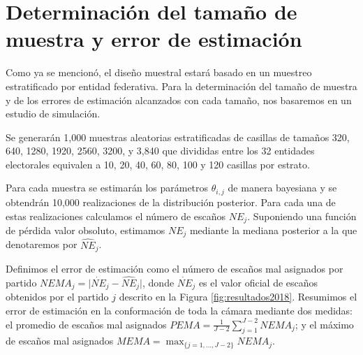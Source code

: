 \documentclass[]{article}
\begin{document}
\hypertarget{diseno-muestral}{%
\section{Determinación del tamaño de muestra y error de estimación}\label{diseno-muestral}}

Como ya se mencionó, el diseño muestral estará basado en un muestreo estratificado por entidad federativa. Para la determinación del tamaño de muestra y de los errores de estimación alcanzados con cada tamaño, nos basaremos en un estudio de simulación. 

Se generarán 1,000 muestras aleatorias estratificadas de casillas de tamaños 320, 640, 1280, 1920, 2560, 3200, y 3,840 que divididas entre los 32 entidades electorales equivalen a 10, 20, 40, 60, 80, 100 y 120 casillas por estrato.

Para cada muestra se estimarán los parámetros $\theta_{i,j}$ de manera bayesiana y se obtendrán 10,000 realizaciones de la distribución posterior. Para cada una de estas realizaciones calculamos el número de escaños $NE_j$. Suponiendo una función de pérdida valor obsoluto, estimamos $NE_j$ mediante la mediana posterior a la que denotaremos por $\widehat{NE}_j$.

Definimos el error de estimación como el número de escaños mal asignados por partido $NEMA_j=\lvert{\dot{NE}_j-\widehat{NE}_j}\rvert$, donde $\dot{NE}_j$ es el valor oficial de escaños obtenidos por el partido $j$ descrito en la Figura \ref{fig:resultados2018}. Resumimos el error de estimación en la conformación de toda la cámara mediante dos medidas: el promedio de escaños mal asignados $PEMA = \frac{1}{J-2} \sum_{j=1}^{J-2}NEMA_j $; y el máximo de escaños mal asignados $MEMA = \max_{\{j=1,\ldots,J-2\}}{NEMA_j}$. 



\end{document}
